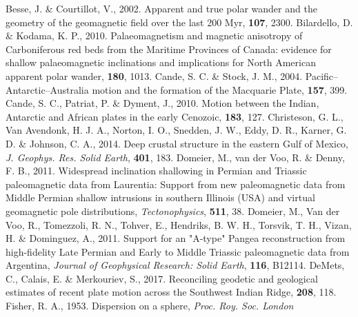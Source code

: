 \begin{thebibliography}{}
  Besse, J. \& Courtillot, V., 2002. Apparent and true polar wander and the
  geometry of the geomagnetic field over the last 200 Myr, \jgr{}\textbf{107},
  2300.
  Bilardello, D. \& Kodama, K. P., 2010. Palaeomagnetism and magnetic
  anisotropy of Carboniferous red beds from the Maritime Provinces of Canada:
  evidence for shallow palaeomagnetic inclinations and implications for North
  American apparent polar wander, \gji{}\textbf{180}, 1013.
  Cande, S. C. \& Stock, J. M., 2004. Pacific–Antarctic–Australia motion and
  the formation of the Macquarie Plate, \gji{}\textbf{157}, 399.
  Cande, S. C., Patriat, P. \& Dyment, J., 2010. Motion between the Indian,
  Antarctic and African plates in the early Cenozoic, \gji{}\textbf{183},
  127.
  Christeson, G. L., Van Avendonk, H. J. A., Norton, I. O., Snedden, J. W.,
  Eddy, D. R., Karner, G. D. \& Johnson, C. A., 2014. Deep crustal structure in
  the eastern Gulf of Mexico, \textit{J. Geophys. Res. Solid Earth},
  \textbf{401}, 183.
  Domeier, M., van der Voo, R. \& Denny, F. B., 2011. Widespread inclination
  shallowing in Permian and Triassic paleomagnetic data from Laurentia: Support
  from new paleomagnetic data from Middle Permian shallow intrusions in
  southern Illinois (USA) and virtual geomagnetic pole distributions,
  \textit{Tectonophysics}, \textbf{511}, 38.
  Domeier, M., Van der Voo, R., Tomezzoli, R. N., Tohver, E., Hendriks, B. W.
  H., Torsvik, T. H., Vizan, H. \& Dominguez, A., 2011. Support for an "A-type"
  Pangea reconstruction from high-fidelity Late Permian and Early to Middle
  Triassic paleomagnetic data from Argentina, \textit{Journal of Geophysical
  Research: Solid Earth}, \textbf{116}, B12114.
  DeMets, C., Calais, E. \& Merkouriev, S., 2017. Reconciling geodetic and
  geological estimates of recent plate motion across the Southwest Indian Ridge,
  \gji{}\textbf{208}, 118.
  Fisher, R. A., 1953. Dispersion on a sphere, \textit{Proc. Roy. Soc. London
}
\end{thebibliography}
